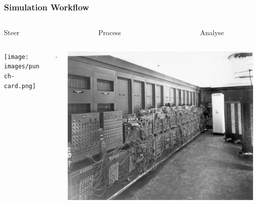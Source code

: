 \begin{frame}
  \frametitle{Simulation Workflow}
  \begin{columns}
    \begin{column}{.3\textwidth}
      \centerline{Steer}
    \end{column}
    \begin{column}{.05\textwidth}
    \end{column}
    \begin{column}{.3\textwidth}
      \centerline{Process}
    \end{column}
    \begin{column}{.05\textwidth}
    \end{column}
    \begin{column}{.3\textwidth}
      \centerline{Analyse}
    \end{column}
  \end{columns}
  \begin{columns}
    \begin{column}{.3\textwidth}
      \begin{center}
        \texttt{[image: images/punch-card.png]}
      \end{center}
    \end{column}
    \begin{column}{.05\textwidth}
      \centerline{$\longrightarrow$}
    \end{column}
    \begin{column}{.3\textwidth}
      \begin{center}
        \includegraphics[width=.9\textwidth]{images/eniac.jpg}

\end{center}
\end{column}
\end{columns}
\end{frame}
